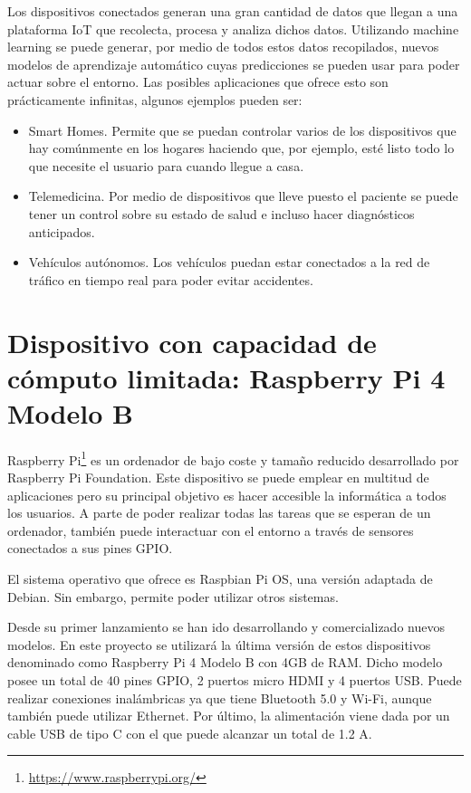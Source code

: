 \documentclass[a4paper, 12pt]{book}
\begin{document}
Los dispositivos conectados generan una gran cantidad de datos que llegan a una plataforma IoT que recolecta, procesa y analiza dichos datos. Utilizando machine learning se puede generar, por medio de todos estos datos recopilados, nuevos modelos de aprendizaje automático cuyas predicciones se pueden usar para poder actuar sobre el entorno. Las posibles aplicaciones que ofrece esto son prácticamente infinitas, algunos ejemplos pueden ser:

\begin{itemize}
    \item Smart Homes. Permite que se puedan controlar varios de los dispositivos que hay comúnmente en los hogares haciendo que, por ejemplo, esté listo todo lo que necesite el usuario para cuando llegue a casa.
    \item Telemedicina. Por medio de dispositivos que lleve puesto el paciente se puede tener un control sobre su estado de salud e incluso hacer diagnósticos anticipados.
    \item Vehículos autónomos. Los vehículos puedan estar conectados a la red de tráfico en tiempo real para poder evitar accidentes.
\end{itemize}

\section{Dispositivo con capacidad de cómputo limitada: Raspberry Pi 4 Modelo B}
\label{sec:dispositivo_hardware}

Raspberry Pi\footnote{\url{https://www.raspberrypi.org/}} es un ordenador de bajo coste y tamaño reducido desarrollado por Raspberry Pi Foundation. Este dispositivo se puede emplear en  multitud de aplicaciones pero su principal objetivo es hacer accesible la informática a todos los usuarios. A parte de poder realizar todas las tareas que se esperan de un ordenador, también puede interactuar con el entorno a través de sensores conectados a sus pines GPIO.

El sistema operativo que ofrece es Raspbian Pi OS, una versión adaptada de Debian. Sin embargo, permite poder utilizar otros sistemas.

Desde su primer lanzamiento se han ido desarrollando y comercializado nuevos modelos. En este proyecto se utilizará la última versión de estos dispositivos denominado como Raspberry Pi 4 Modelo B con 4GB de RAM. Dicho modelo posee un total de 40 pines GPIO, 2 puertos micro HDMI y 4 puertos USB. Puede realizar conexiones inalámbricas ya que tiene Bluetooth 5.0 y Wi-Fi, aunque también puede utilizar Ethernet. Por último, la alimentación viene dada por un cable USB de tipo C con el que puede alcanzar un total de 1.2 A.
\end{document}
